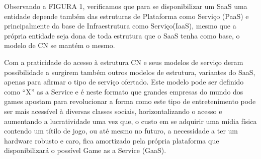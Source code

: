 \begin{justify}
    Observando a FIGURA 1, verificamos que para se disponibilizar um SaaS uma entidade depende também das estruturas de Plataforma como
    Serviço (PaaS) e principalmente da base de Infraestrutura como Serviço(IaaS), mesmo que a própria entidade seja dona de toda estrutura que o
    SaaS tenha como base, o modelo de CN se mantém o mesmo.

    Com a praticidade do acesso à estrutura CN e seus modelos de serviço deram possibilidade a surgirem também outros modelos de estrutura,
    variantes do SaaS, apenas para afirmar o tipo de serviço ofertado. Este modelo pode ser definido como “X” as a Service e é neste formato que
    grandes empresas do mundo dos games apostam para revolucionar a forma como este tipo de entretenimento pode ser mais acessível à
    diversas classes sociais, horizontalizando o acesso e aumentando a lucratividade uma vez que, o custo em se adquirir uma mídia física contendo
    um títilo de jogo, ou até mesmo no futuro, a necessidade a ter um hardware robusto e caro, fica amortizado pela própria plataforma que
    disponibilizará o possível Game as a Service (GaaS).
\end{justify}
